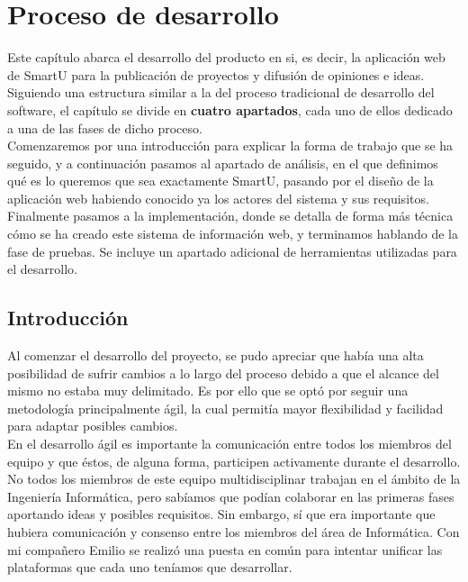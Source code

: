 \chapter{Proceso de desarrollo}
\label{ch:desarrollo}
Este capítulo abarca el desarrollo del producto en si, es decir, la aplicación web de SmartU para la publicación de proyectos y difusión de opiniones e ideas. Siguiendo una estructura similar a la del proceso tradicional de desarrollo del software, el capítulo se divide en \textbf{cuatro apartados}, cada uno de ellos dedicado a una de las fases de dicho proceso.\\

Comenzaremos por una introducción para explicar la forma de trabajo que se ha seguido, y a continuación pasamos al apartado de análisis, en el que definimos qué es lo queremos que sea exactamente SmartU, pasando por el diseño de la aplicación web habiendo conocido ya los actores del sistema y sus requisitos.\\

Finalmente pasamos a la implementación, donde se detalla de forma más técnica cómo se ha creado este sistema de información web, y terminamos hablando de la fase de pruebas. Se incluye un apartado adicional de herramientas utilizadas para el desarrollo.

\section{Introducción}
Al comenzar el desarrollo del proyecto, se pudo apreciar que había una alta posibilidad de sufrir cambios a lo largo del proceso debido a que el alcance del mismo no estaba muy delimitado. Es por ello que se optó por seguir una metodología principalmente ágil, la cual permitía mayor flexibilidad y facilidad para adaptar posibles cambios.\\

En el desarrollo ágil es importante la comunicación entre todos los miembros del equipo y que éstos, de alguna forma, participen activamente durante el desarrollo. No todos los miembros de este equipo multidisciplinar trabajan en el ámbito de la Ingeniería Informática, pero sabíamos que podían colaborar en las primeras fases aportando ideas y posibles requisitos. Sin embargo, sí que era importante que hubiera comunicación y consenso entre los miembros del área de Informática. Con mi compañero Emilio se realizó una puesta en común para intentar unificar las plataformas que cada uno teníamos que desarrollar.\\

